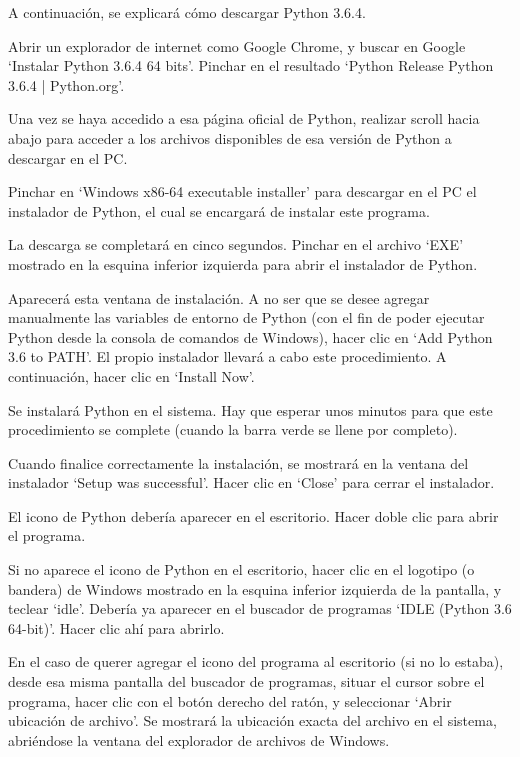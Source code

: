 \documentclass[12pt]{article}
\begin{document}
A continuación, se explicará cómo descargar Python 3.6.4.

Abrir un explorador de internet como Google Chrome, y buscar en Google ‘Instalar Python 3.6.4 64 bits’. Pinchar en el resultado ‘Python Release Python 3.6.4 | Python.org’.



Una vez se haya accedido a esa página oficial de Python, realizar scroll hacia abajo para acceder a los archivos disponibles de esa versión de Python a descargar en el PC.



Pinchar en ‘Windows x86-64 executable installer’ para descargar en el PC el instalador de Python, el cual se encargará de instalar este programa.



La descarga se completará en cinco segundos. Pinchar en el archivo ‘EXE’ mostrado en la esquina inferior izquierda para abrir el instalador de Python.



Aparecerá esta ventana de instalación. A no ser que se desee agregar manualmente las variables de entorno de Python (con el fin de poder ejecutar Python desde la consola de comandos de Windows), hacer clic en ‘Add Python 3.6 to PATH’. El propio instalador llevará a cabo este procedimiento. A continuación, hacer clic en ‘Install Now’.



Se instalará Python en el sistema. Hay que esperar unos minutos para que este procedimiento se complete (cuando la barra verde se llene por completo).



Cuando finalice correctamente la instalación, se mostrará en la ventana del instalador ‘Setup was successful’. Hacer clic en ‘Close’ para cerrar el instalador.



El icono de Python debería aparecer en el escritorio. Hacer doble clic para abrir el programa.



Si no aparece el icono de Python en el escritorio, hacer clic en el logotipo (o bandera) de Windows mostrado en la esquina inferior izquierda de la pantalla, y teclear ‘idle’. Debería ya aparecer en el buscador de programas ‘IDLE (Python 3.6 64-bit)’. Hacer clic ahí para abrirlo.



En el caso de querer agregar el icono del programa al escritorio (si no lo estaba), desde esa misma pantalla del buscador de programas, situar el cursor sobre el programa, hacer clic con el botón derecho del ratón, y seleccionar ‘Abrir ubicación de archivo’. Se mostrará la ubicación exacta del archivo en el sistema, abriéndose la ventana del explorador de archivos de Windows.
\end{document}

